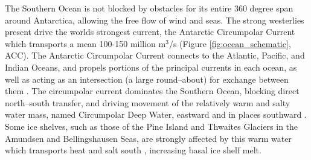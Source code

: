 The Southern Ocean is not blocked by obstacles for its entire 360 degree span around Antarctica, allowing the free flow of wind and seas. The strong westerlies present drive the worlds strongest current, the Antarctic Circumpolar Current which transports a mean 100-150 million $\mathrm{m}^3$/s \citep{knauss2016introduction} (Figure \ref{fig:ocean_schematic}, ACC). The Antarctic Circumpolar Current connects to the Atlantic, Pacific, and Indian Oceans, and propels portions of the principal currents in each ocean, as well as acting as an intersection (a large round--about) for exchange between them \citep{knauss2016introduction}. The circumpolar current dominates the Southern Ocean, blocking direct north--south transfer, and driving movement of the relatively warm and salty water mass, named Circumpolar Deep Water, eastward and in places southward \citep{knauss2016introduction}. Some ice shelves, such as those of the Pine Island and Thwaites Glaciers \citep{nakayama2019pathways} in the Amundsen and Bellingshausen Seas,  are strongly affected by this warm water which transports heat and salt south \citep{nakayama2018origin}, increasing basal ice shelf melt. 

